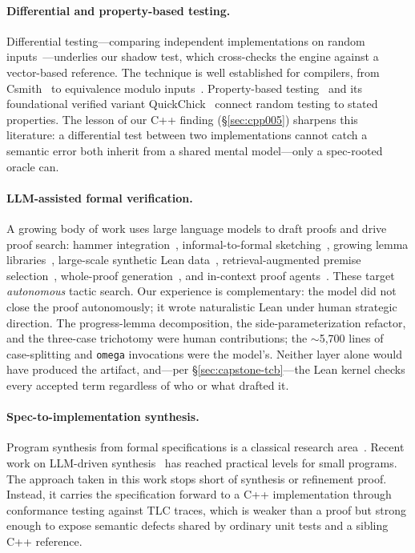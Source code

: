 \documentclass[11pt,a4paper]{article}
\begin{document}
\paragraph{Differential and property-based testing.}
Differential testing---comparing independent implementations on random
inputs~\cite{McKeeman1998}---underlies our shadow test, which
cross-checks the engine against a vector-based reference. The technique
is well established for compilers, from Csmith~\cite{Csmith2011} to
equivalence modulo inputs~\cite{EMI2014}. Property-based
testing~\cite{Claessen2000} and its foundational verified variant
QuickChick~\cite{QuickChick2015} connect random testing to stated
properties. The lesson of our C++ finding (\S\ref{sec:cpp005}) sharpens
this literature: a differential test between two implementations cannot
catch a semantic error both inherit from a shared mental model---only a
spec-rooted oracle can.

\paragraph{LLM-assisted formal verification.}
A growing body of work uses large language models to draft proofs and
drive proof search: hammer integration~\cite{Thor2022},
informal-to-formal sketching~\cite{DraftSketch2023}, growing lemma
libraries~\cite{LEGOProver2024}, large-scale synthetic Lean
data~\cite{DeepSeekProver2024}, retrieval-augmented premise
selection~\cite{Yang2023}, whole-proof generation~\cite{First2023}, and
in-context proof agents~\cite{COPRA2024}. These target \emph{autonomous}
tactic search. Our experience is complementary: the model did not close
the proof autonomously; it wrote naturalistic Lean under human strategic
direction. The progress-lemma decomposition, the side-parameterization
refactor, and the three-case trichotomy were human contributions; the
$\sim$5{,}700 lines of case-splitting and \texttt{omega} invocations
were the model's. Neither layer alone would have produced the artifact,
and---per \S\ref{sec:capstone-tcb}---the Lean kernel checks every
accepted term regardless of who or what drafted it.

\paragraph{Spec-to-implementation synthesis.}
Program synthesis from formal specifications is a classical research
area~\cite{Manna1980}. Recent work on LLM-driven
synthesis~\cite{Jain2022} has reached practical levels for small
programs. The approach taken in this work stops short of synthesis or refinement
proof. Instead, it carries the specification forward to a C++
implementation through conformance testing against TLC traces, which is
weaker than a proof but strong enough to expose semantic defects shared
by ordinary unit tests and a sibling C++ reference.
\end{document}
